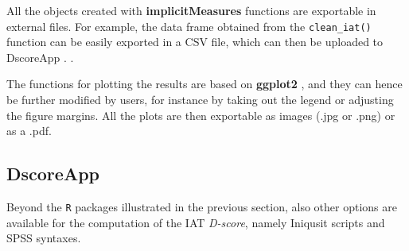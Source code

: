\documentclass[12pt]{book}
\begin{document}

All the objects created with \textbf{implicitMeasures} functions are exportable in external files. For example, the data frame obtained from the \texttt{clean\_iat()} function can be easily exported in a CSV file, which can then be uploaded to DscoreApp \cite[see Section \ref{sec:dscoreapp}]{dscoreapp}. .  

The functions for plotting the results are based on \textbf{ggplot2} \cite{ggplot2}, and they can hence be further modified by users, for instance by taking out the legend or adjusting the figure margins. All the plots are then exportable as images (.jpg or .png) or as a .pdf.

\subsection{DscoreApp}\label{sec:dscoreapp}

Beyond the \texttt{R} packages illustrated in the previous section, also other options are available for the computation of the IAT \emph{D-score}, namely Iniqusit scripts and SPSS syntaxes. 

\end{document}
